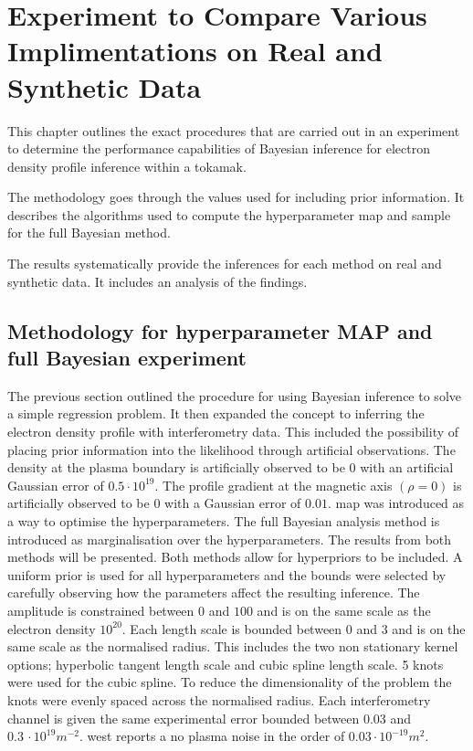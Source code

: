 \chapter{Experiment to Compare Various Implimentations on Real and Synthetic Data}

This chapter outlines the exact procedures that are carried out in an experiment to determine the performance capabilities of Bayesian inference for electron density profile inference within a tokamak.

The methodology goes through the values used for including prior information. It describes the algorithms used to compute the hyperparameter \gls{map} and sample for the full Bayesian method.

The results systematically provide the inferences for each method on real and synthetic data. It includes an analysis of the findings.

\section{Methodology for hyperparameter MAP and full Bayesian experiment}
The previous section outlined the procedure for using Bayesian inference to solve a simple regression problem. It then expanded the concept to inferring the electron density profile with interferometry data. This included the possibility of placing prior information into the likelihood through artificial observations. The density at the plasma boundary is artificially observed to be 0 with an artificial Gaussian error of $0.5 \cdot 10^{19}$. The profile gradient at the magnetic axis $(\rho=0)$ is artificially observed to be 0 with a Gaussian error of $0.01$. \gls{map} was introduced as a way to optimise the hyperparameters. The full Bayesian analysis method is introduced as marginalisation over the hyperparameters. The results from both methods will be presented. Both methods allow for hyperpriors to be included. A uniform prior is used for all hyperparameters and the bounds were selected by carefully observing how the parameters affect the resulting inference. The amplitude is constrained between $0$ and $100$ and is on the same scale as the electron density $10^{20}$. Each length scale is bounded between $0$ and $3$ and is on the same scale as the normalised radius. This includes the two non stationary kernel options; hyperbolic tangent length scale and cubic spline length scale. 5 knots were used for the cubic spline. To reduce the dimensionality of the problem the knots were evenly spaced across the normalised radius. Each interferometry channel is given the same experimental error bounded between $0.03$ and $0.3 \, \cdot 10^{19}m^{-2}$. \gls{west} reports a no plasma noise in the order of $0.03 \cdot10^{-19}m^2$. 

